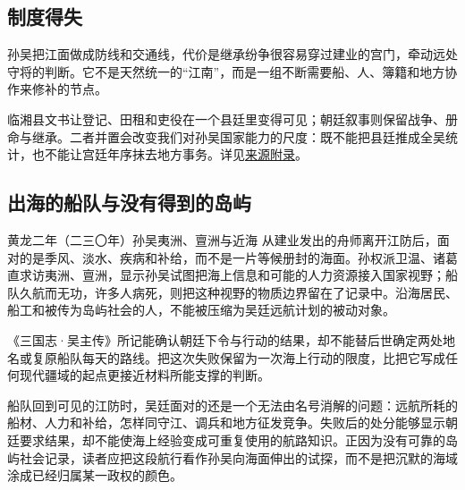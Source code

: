 \subsection{制度得失}

孙吴把江面做成防线和交通线，代价是继承纷争很容易穿过建业的宫门，牵动远处守将的判断。它不是天然统一的“江南”，而是一组不断需要船、人、簿籍和地方协作来修补的节点。

\begin{sourcenote}[吴简的近景不能替代国史]
临湘县文书让登记、田租和吏役在一个县廷里变得可见；朝廷叙事则保留战争、册命与继承。二者并置会改变我们对孙吴国家能力的尺度：既不能把县廷推成全吴统计，也不能让宫廷年序抹去地方事务。详见\hyperref[app:sources]{来源附录}。
\end{sourcenote}

\subsection{出海的船队与没有得到的岛屿}
\begin{event}{}{黄龙二年（二三〇年）}{孙吴}{夷洲、亶洲与近海}
从建业发出的舟师离开江防后，面对的是季风、淡水、疾病和补给，而不是一片等候册封的海面。孙权派卫温、诸葛直求访夷洲、亶洲，显示孙吴试图把海上信息和可能的人力资源接入国家视野；船队久航而无功，许多人病死，则把这种视野的物质边界留在了记录中。沿海居民、船工和被传为岛屿社会的人，不能被压缩为吴廷远航计划的被动对象。

\begin{sourcenote}[夷洲、亶洲不等于今天地图上的一个点]
《三国志·吴主传》所记能确认朝廷下令与行动的结果，却不能替后世确定两处地名或复原船队每天的路线。把这次失败保留为一次海上行动的限度，比把它写成任何现代疆域的起点更接近材料所能支撑的判断。
\end{sourcenote}

船队回到可见的江防时，吴廷面对的还是一个无法由名号消解的问题：远航所耗的船材、人力和补给，怎样同守江、调兵和地方征发竞争。失败后的处分能够显示朝廷要求结果，却不能使海上经验变成可重复使用的航路知识。正因为没有可靠的岛屿社会记录，读者应把这段航行看作孙吴向海面伸出的试探，而不是把沉默的海域涂成已经归属某一政权的颜色。
\end{event}


